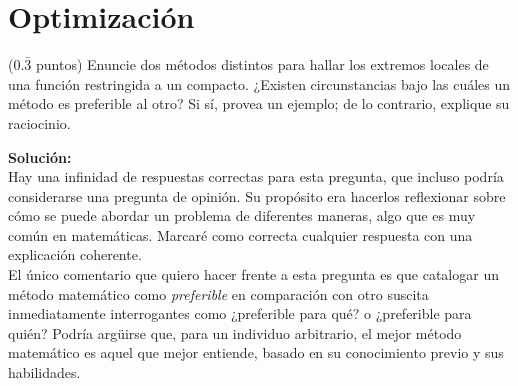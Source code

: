 \documentclass{fmbvecto}
\begin{document}

\section{Optimización}

\begin{problema}[]
    (\(0.\bar{3}\) puntos)  Enuncie dos métodos distintos para hallar los extremos locales de una función restringida a un compacto. ¿Existen circunstancias bajo las cuáles un método es preferible al otro? Si sí, provea un ejemplo; de lo contrario, explique su raciocinio.


\vspace{1em}
\tcblower
\textbf{Solución:}\\

    Hay una infinidad de respuestas correctas para esta pregunta, que incluso podría considerarse una pregunta de opinión. Su propósito era hacerlos reflexionar sobre cómo se puede abordar un problema de diferentes maneras, algo que es muy común en matemáticas. Marcaré como correcta cualquier respuesta con una explicación coherente. \\

    El único comentario que quiero hacer frente a esta pregunta es que catalogar un método matemático como \textit{preferible} en comparación con otro suscita inmediatamente interrogantes como ¿preferible para qué? o ¿preferible para quién? Podría argüirse que, para un individuo arbitrario, el mejor método matemático es aquel que mejor entiende, basado en su conocimiento previo y sus habilidades.
\end{problema}

\phantom{} %
\end{document}
